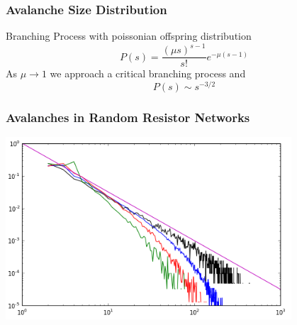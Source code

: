 \documentclass[mathserif]{beamer}
\begin{document}
\begin{frame}
\frametitle{Avalanche Size Distribution}


\end{frame}

\begin{frame}

Branching Process with poissonian offspring distribution
$$P(s) = \frac{(\mu s)^{s-1}}{s!} e^{-\mu(s-1)}$$
 As $\mu\to 1$ we approach a critical branching process and
$$P(s) \sim s^{-3/2}$$
\end{frame}

\begin{frame}
\frametitle{Avalanches in Random Resistor Networks}
\includegraphics[width=0.8\textwidth]{Avalanches_p6.png}

\end{frame}
\end{document}
